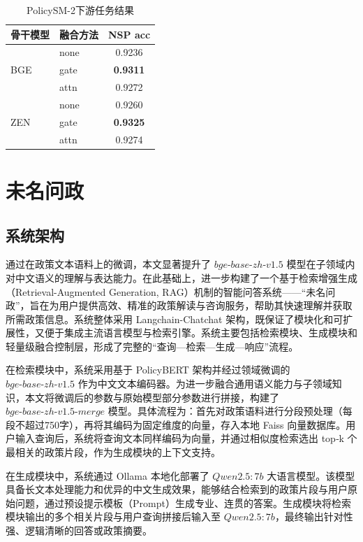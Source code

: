 \documentclass[12pt, a4paper]{ctexart}
\begin{document}
  \begin{table}[htbp]
    \renewcommand{\arraystretch}{1}
    \centering
    \caption{PolicySM-2下游任务结果}
    \begin{tabular}{llc}
      \toprule
      骨干模型 & 融合方法 & NSP acc \\
      \midrule
      \multirow{3}{*}{BGE}
        & none & 0.9236 \\
        & gate & \textbf{0.9311} \\
        & attn & 0.9272 \\
      \midrule
      \multirow{3}{*}{ZEN}
        & none & 0.9260 \\
        & gate & \textbf{0.9325} \\
        & attn & 0.9274 \\
      \bottomrule
    \end{tabular}
    \label{tab:nsp-results}
  \end{table}

\newpage
\section{未名问政}

\subsection{系统架构}

通过在政策文本语料上的微调，本文显著提升了 $bge\text{-}base\text{-}zh\text{-}v1.5$ 模型在子领域内对中文语义的理解与表达能力。在此基础上，进一步构建了一个基于检索增强生成（Retrieval-Augmented Generation, RAG）机制的智能问答系统——“未名问政”，旨在为用户提供高效、精准的政策解读与咨询服务，帮助其快速理解并获取所需政策信息。系统整体采用 Langchain-Chatchat 架构，既保证了模块化和可扩展性，又便于集成主流语言模型与检索引擎。系统主要包括检索模块、生成模块和轻量级融合控制层，形成了完整的“查询—检索—生成—响应”流程。

在检索模块中，系统采用基于 PolicyBERT 架构并经过领域微调的 $bge\text{-}base\text{-}zh\text{-}v1.5$ 作为中文文本编码器。为进一步融合通用语义能力与子领域知识，本文将微调后的参数与原始模型部分参数进行拼接，构建了 $bge\text{-}base\text{-}zh\text{-}v1.5\text{-}merge$ 模型。具体流程为：首先对政策语料进行分段预处理（每段不超过750字），再将其编码为固定维度的向量，存入本地 Faiss 向量数据库。用户输入查询后，系统将查询文本同样编码为向量，并通过相似度检索选出 top‑k 个最相关的政策片段，作为生成模块的上下文支持。

在生成模块中，系统通过 Ollama 本地化部署了 $Qwen2.5:7b$ 大语言模型。该模型具备长文本处理能力和优异的中文生成效果，能够结合检索到的政策片段与用户原始问题，通过预设提示模板（Prompt）生成专业、连贯的答案。生成模块将检索模块输出的多个相关片段与用户查询拼接后输入至 $Qwen2.5:7b$，最终输出针对性强、逻辑清晰的回答或政策摘要。
\end{document}
